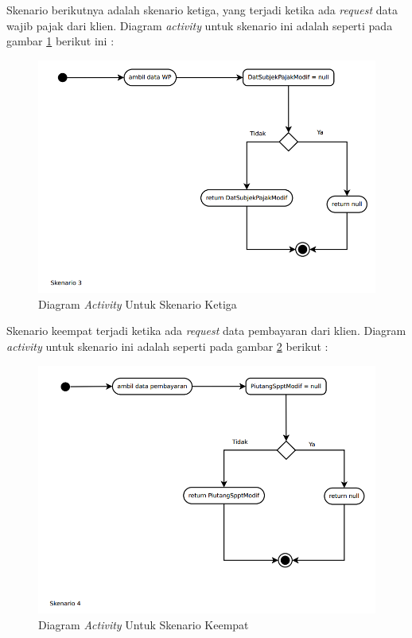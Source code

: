 \documentclass[pdftex,12pt, oneside]{article}
\begin{document}
Skenario berikutnya adalah skenario ketiga, yang terjadi ketika ada \textit{request} data wajib pajak dari klien. Diagram \textit{activity} untuk skenario ini adalah seperti pada gambar \ref{fig:act-dia-3} berikut ini :

\begin{figure}[H]
	\centering
	\includegraphics[width=1\textwidth]{./resources/activity-dia-3}
	\caption{Diagram \textit{Activity} Untuk Skenario Ketiga}
	\label{fig:act-dia-3}
\end{figure}

Skenario keempat terjadi ketika ada \textit{request} data pembayaran dari klien. Diagram \textit{activity} untuk skenario ini adalah seperti pada gambar \ref{fig:act-dia-4} berikut :

\begin{figure}[H]
	\centering
	\includegraphics[width=1\textwidth]{./resources/activity-dia-4}
	\caption{Diagram \textit{Activity} Untuk Skenario Keempat}
	\label{fig:act-dia-4}
\end{figure}
\end{document}
